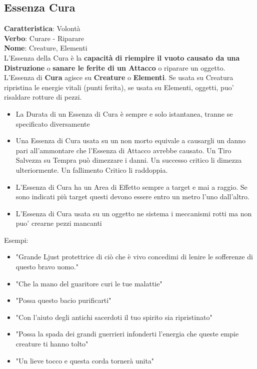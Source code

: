 \documentclass[a4paper,11pt,twoside,openany]{book}
\begin{document}
\pagebreak

\subsection{Essenza Cura}

\label{essenza-cura---volonta}


\textbf{Caratteristica}: Volontà\\
\textbf{Verbo}: Curare - Riparare\\
\textbf{Nome}: Creature, Elementi\\

L'Essenza della Cura è la \textbf{capacità di riempire il vuoto causato da una Distruzione} o \textbf{sanare le ferite di un Attacco} o riparare un oggetto. L'Essenza di \textbf{Cura} agisce su \textbf{Creature} o \textbf{Elementi}. Se usata su Creatura ripristina le energie vitali (punti ferita), se usata su Elementi, oggetti, puo' risaldare rotture di pezzi.


\begin{itemize}
	\item
	      La Durata di un Essenza di Cura è sempre e solo istantanea, tranne se specificato diversamente
	\item
	      Una Essenza di Cura usata su un non morto equivale a causargli un danno pari all'ammontare che l'Essenza di Attacco avrebbe causato. Un Tiro Salvezza su Tempra può dimezzare i danni. Un successo critico li dimezza ulteriormente. Un fallimento Critico li raddoppia.
	\item
	      L'Essenza di Cura ha un Area di Effetto sempre a target e mai a raggio. Se sono indicati più target questi devono essere entro un metro l'uno dall'altro.
	\item      
	     L'Essenza di Cura usata su un oggetto ne sistema i meccanismi rotti ma non puo' crearne pezzi mancanti 
\end{itemize}


Esempi:
\begin{itemize}
	\item
	"Grande Ljust protettrice di ciò che è vivo concedimi di lenire le sofferenze di questo bravo uomo."
	\item
	"Che la mano del guaritore curi le tue malattie"
	\item
	"Possa questo bacio purificarti"
	\item
	"Con l'aiuto degli antichi sacerdoti il tuo spirito sia ripristinato"
	\item
	"Possa la spada dei grandi guerrieri infonderti l'energia che queste empie creature ti hanno tolto"
	\item "Un lieve tocco e questa corda tornerà unita"
\end{itemize}
\end{document}
